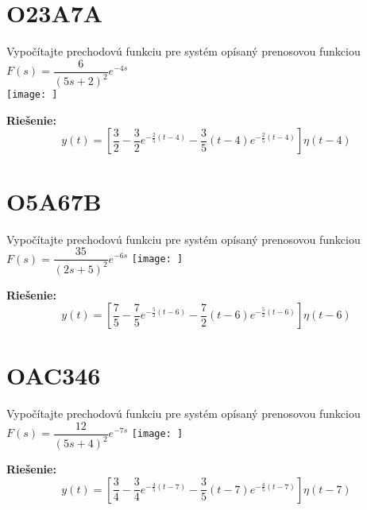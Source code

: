 \documentclass[a4paper, 12pt]{article}
\newenvironment{task}{}{}
\newenvironment{solution}{\noindent\textbf{Riešenie:}}{}
\begin{document}
\section*{O23A7A}
\begin{task}
    Vypočítajte prechodovú funkciu pre systém opísaný prenosovou funkciou $F(s)=\dfrac{6}{(5s+2)^2}e^{-4s}$ \\
    \texttt{[image: ]}
\end{task} 

\begin{solution}
    \begin{equation*}
        y(t)=\left[ \dfrac{3}{2}-\dfrac{3}{2}e^{-\frac{2}{5}(t-4)}-\dfrac{3}{5}(t-4)e^{-\frac{2}{5}(t-4)} \right] \eta(t-4)
    \end{equation*}
\end{solution}



\section*{O5A67B}
\begin{task}
    Vypočítajte prechodovú funkciu pre systém opísaný prenosovou funkciou $F(s)=\dfrac{35}{(2s+5)^2}e^{-6s}$
    \texttt{[image: ]}
\end{task} 

\begin{solution}
    \begin{equation*}
        y(t)=\left[ \dfrac{7}{5}-\dfrac{7}{5}e^{-\frac{5}{2}(t-6)}-\dfrac{7}{2}(t-6)e^{-\frac{5}{2}(t-6)} \right] \eta(t-6)
    \end{equation*}
\end{solution}


\section*{OAC346}
\begin{task}
    Vypočítajte prechodovú funkciu pre systém opísaný prenosovou funkciou $F(s)=\dfrac{12}{(5s+4)^2}e^{-7s}$
    \texttt{[image: ]}
\end{task} 

\begin{solution}
    \begin{equation*}
        y(t)=\left[ \dfrac{3}{4}-\dfrac{3}{4}e^{-\frac{4}{5}(t-7)}-\dfrac{3}{5}(t-7)e^{-\frac{4}{5}(t-7)} \right] \eta(t-7)
    \end{equation*}
\end{solution}
\end{document}
